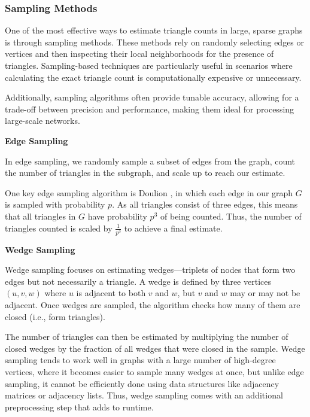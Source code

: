 \documentclass[12pt]{article}
\newcommand{\subsubsubsection}[1]{
  \vspace{1em} %
  \noindent\textbf{#1} %
  \vspace{0.5em} %
}
\begin{document}
\subsubsection{Sampling Methods}

One of the most effective ways to estimate triangle counts in large, sparse graphs is through sampling methods.
These methods rely on randomly selecting edges or vertices and then inspecting their local neighborhoods for the presence of triangles.
Sampling-based techniques are particularly useful in scenarios where calculating the exact triangle count is computationally expensive or unnecessary.

Additionally, sampling algorithms often provide tunable accuracy, allowing for a trade-off between precision and performance, making them ideal for processing large-scale networks.

\subsubsubsection{Edge Sampling}

In edge sampling, we randomly sample a subset of edges from the graph, count the number of triangles in the subgraph, and scale up to reach our estimate.

One key edge sampling algorithm is Doulion \cite{tsourakakis_doulion_2009}, in which each edge in our graph $G$ is sampled with probability $p$.
As all triangles consist of three edges, this means that all triangles in $G$ have probability $p^3$ of being counted.
Thus, the number of triangles counted is scaled by $\frac{1}{p^3}$ to achieve a final estimate.

\subsubsubsection{Wedge Sampling}

Wedge sampling \cite{seshadhri_triadic_2013} focuses on estimating wedges—triplets of nodes that form two edges but not necessarily a triangle.
A wedge is defined by three vertices $(u, v, w)$ where $u$ is adjacent to both $v$ and $w$, but $v$ and $w$ may or may not be adjacent.
Once wedges are sampled, the algorithm checks how many of them are closed (i.e., form triangles).

The number of triangles can then be estimated by multiplying the number of closed wedges by the fraction of all wedges that were closed in the sample.
Wedge sampling tends to work well in graphs with a large number of high-degree vertices, where it becomes easier to sample many wedges at once, but unlike edge sampling, it cannot be efficiently done using data structures like adjacency matrices or adjacency lists.
Thus, wedge sampling comes with an additional preprocessing step that adds to runtime.
\end{document}
